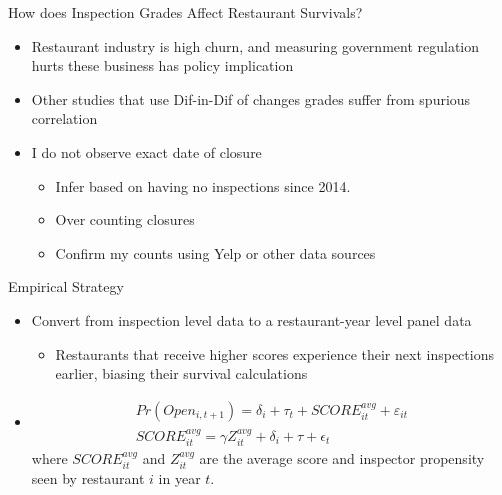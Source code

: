 \documentclass[handout]{beamer}
\begin{document}
\iffalse

\begin{frame}{How does Inspection Grades Affect Restaurant Survivals?}
\begin{itemize}
\item Restaurant industry is high churn, and measuring government regulation hurts these business has policy implication
\item Other studies that use Dif-in-Dif of changes grades suffer from spurious correlation
\item I do not observe exact date of closure
\begin{itemize}
\item Infer based on having no inspections since 2014. 
\item Over counting closures
\item Confirm my counts using Yelp or other data sources
\end{itemize}
\end{itemize}
\end{frame}
\begin{frame}{Empirical Strategy}
\begin{itemize}
\item Convert from inspection level data to a restaurant-year level panel data
\begin{itemize}
\item Restaurants that receive higher scores experience their next inspections earlier, biasing their survival calculations 
\end{itemize}
\item
\begin{align*}
    Pr(Open_{i,t+1}) = \delta_i + \tau_t + SCORE^{avg}_{it} + \varepsilon_{it} \\
    SCORE^{avg}_{it} = \gamma Z^{avg}_{it} + \delta_i + \tau + \epsilon_t
\end{align*}
where $SCORE^{avg}_{it}$ and $Z^{avg}_{it}$ are the average score and inspector propensity seen by restaurant $i$ in year $t$. 
\end{itemize}
\end{frame}
\end{document}
